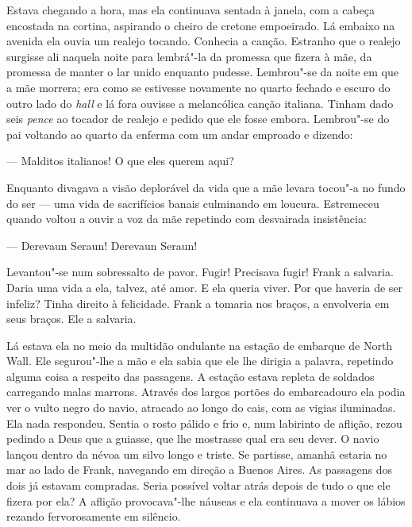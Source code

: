 Estava chegando a hora, mas ela continuava sentada à janela, com a cabeça
encostada na cortina, aspirando o cheiro de cretone empoeirado.  Lá embaixo na
avenida ela ouvia um realejo tocando.  Conhecia a canção.  Estranho que o
realejo surgisse ali naquela noite para lembrá"-la da promessa que fizera à mãe,
da promessa de manter o lar unido enquanto pudesse.  Lembrou"-se da noite em que
a mãe morrera; era como se estivesse novamente no quarto fechado e escuro do
outro lado do \textit{hall} e lá fora ouvisse a melancólica canção italiana.
Tinham dado seis \textit{pence} ao tocador de realejo e pedido que ele fosse
embora.  Lembrou"-se do pai voltando ao quarto da enferma com um andar emproado
e dizendo:

--- Malditos italianos!  O que eles querem aqui?

Enquanto divagava a visão deplorável da vida que a mãe levara tocou"-a no fundo
do ser --- uma vida de sacrifícios banais culminando em loucura.  Estremeceu
quando voltou a ouvir a voz da mãe repetindo com desvairada insistência:

--- Derevaun Seraun! Derevaun Seraun!

Levantou"-se num sobressalto de pavor.  Fugir!  Precisava fugir!  Frank a
salvaria.  Daria uma vida a ela, talvez, até amor.  E ela queria viver.  Por
que haveria de ser infeliz?  Tinha direito à felicidade.  Frank a tomaria nos
braços, a envolveria em seus braços.  Ele a salvaria.

\smallskip

\noindent\dotfill

\smallskip

Lá estava ela no meio da multidão ondulante na estação de embarque de North
Wall.  Ele segurou"-lhe a mão e ela sabia que ele lhe dirigia a palavra,
repetindo alguma coisa a respeito das passagens.  A estação estava repleta de
soldados carregando malas marrons.  Através dos largos portões do embarcadouro
ela podia ver o vulto negro do navio, atracado ao longo do cais, com as vigias
iluminadas.  Ela nada respondeu.  Sentia o rosto pálido e frio e, num labirinto
de aflição, rezou pedindo a Deus que a guiasse, que lhe mostrasse qual era seu
dever.  O navio lançou dentro da névoa um silvo longo e triste.  Se partisse,
amanhã estaria no mar ao lado de Frank, navegando em direção a Buenos Aires.
As passagens dos dois já estavam compradas.  Seria possível voltar atrás depois
de tudo o que ele fizera por ela?  A aflição provocava"-lhe náuseas e ela
continuava a mover os lábios rezando fervorosamente em silêncio.

